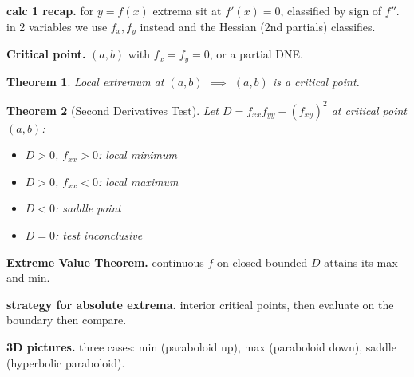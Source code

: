\documentclass[12pt]{article}
\theoremstyle{compact}
\newtheorem{thm}{Theorem}[section]
\begin{document}
\medskip\textbf{calc 1 recap.} for $y=f(x)$ extrema sit at $f'(x)=0$, classified by sign of $f''$. in 2 variables we use $f_x,f_y$ instead and the Hessian (2nd partials) classifies.

\textbf{Critical point.} $(a,b)$ with $f_x=f_y=0$, or a partial DNE.

\begin{thm}
Local extremum at $(a,b)$ $\implies$ $(a,b)$ is a critical point.
\end{thm}

\begin{thm}[Second Derivatives Test]
Let $D = f_{xx}f_{yy}-(f_{xy})^2$ at critical point $(a,b)$:
\begin{itemize}[noitemsep]
\item $D>0$, $f_{xx}>0$: local minimum
\item $D>0$, $f_{xx}<0$: local maximum
\item $D<0$: saddle point
\item $D=0$: test inconclusive
\end{itemize}
\end{thm}

\textbf{Extreme Value Theorem.} continuous $f$ on closed bounded $D$ attains its max and min.

\textbf{strategy for absolute extrema.} interior critical points, then evaluate on the boundary then compare.

\medskip\textbf{3D pictures.} three cases: min (paraboloid up), max (paraboloid down), saddle (hyperbolic paraboloid).
\end{document}
